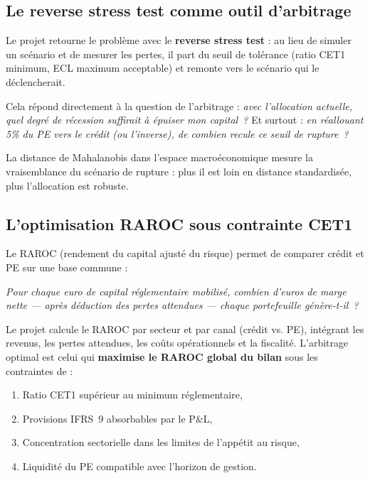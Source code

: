 \documentclass[12pt,a4paper]{article}
\begin{document}
\subsection{Le reverse stress test comme outil d'arbitrage}

Le projet retourne le problème avec le \textbf{reverse stress test} : au lieu de simuler un scénario et de mesurer les pertes, il part du seuil de tolérance (ratio CET1 minimum, ECL maximum acceptable) et remonte vers le scénario qui le déclencherait.

Cela répond directement à la question de l'arbitrage : \textit{avec l'allocation actuelle, quel degré de récession suffirait à épuiser mon capital~?} Et surtout : \textit{en réallouant 5\% du PE vers le crédit (ou l'inverse), de combien recule ce seuil de rupture~?}

La distance de Mahalanobis dans l'espace macroéconomique mesure la \og vraisemblance\fg{} du scénario de rupture : plus il est loin en distance standardisée, plus l'allocation est robuste.

\subsection{L'optimisation RAROC sous contrainte CET1}

Le RAROC (rendement du capital ajusté du risque) permet de comparer crédit et PE sur une base commune :

\begin{displayquote}
\textit{Pour chaque euro de capital réglementaire mobilisé, combien d'euros de marge nette --- après déduction des pertes attendues --- chaque portefeuille génère-t-il~?}
\end{displayquote}

Le projet calcule le RAROC par secteur et par canal (crédit vs. PE), intégrant les revenus, les pertes attendues, les coûts opérationnels et la fiscalité. L'arbitrage optimal est celui qui \textbf{maximise le RAROC global du bilan} sous les contraintes de :

\begin{enumerate}
  \item Ratio CET1 supérieur au minimum réglementaire,
  \item Provisions IFRS~9 absorbables par le P\&L,
  \item Concentration sectorielle dans les limites de l'appétit au risque,
  \item Liquidité du PE compatible avec l'horizon de gestion.
\end{enumerate}
\end{document}
